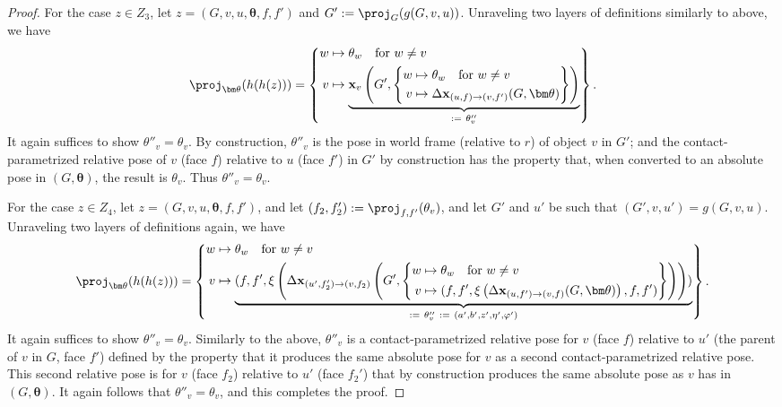 \begin{proof}
For the case $z \in Z_3$, let $z = (G, v, u, \bm\theta, f, f')$ and $G' := \proj_G(g(G, v, u))$.
Unraveling two layers of definitions similarly to above, we have
\[
    \proj_{\bm\theta}(h(h(z))) = \left\{\begin{aligned}
        w &\mapsto \theta_w \quad\text{for $w \neq v$} \\
        v &\mapsto \underbrace{
            \mathbf{x}_v\left(
                G',
                \left\{\begin{aligned}
                        w &\mapsto \theta_w \quad\text{for $w \neq v$} \\
                        v &\mapsto \Delta\mathbf{x}_{(u,f) \to (v,f')}(G, \bm\theta)
                \end{aligned}\right\}
            \right)
        }_{:=\ \theta''_v}
    \end{aligned}\right\}.
\]
It again suffices to show $\theta''_v = \theta_v$.
By construction, $\theta''_v$ is the pose in world frame (relative to $r$) of object $v$ in $G'$; and the contact-parametrized relative pose of $v$ (face $f$) relative to $u$ (face $f'$) in $G'$ by construction has the property that, when converted to an absolute pose in $(G, \bm\theta)$, the result is $\theta_v$.
Thus $\theta''_v = \theta_v$.

For the case $z \in Z_4$, let $z = (G, v, u, \bm\theta, f, f')$, and let $(f_2, f_2') := \proj_{f,f'}(\theta_v)$, and let $G'$ and $u'$ be such that $(G', v, u') = g(G, v, u)$.
Unraveling two layers of definitions again, we have
\[
    \proj_{\bm\theta}(h(h(z))) = \left\{\begin{aligned}
        w &\mapsto \theta_w \quad\text{for $w \neq v$} \\
        v &\mapsto \underbrace{(f, f', \xi\left(
                \Delta\mathbf{x}_{(u', f_2') \to (v, f_2)}\left(
                    G',
                    \left\{\begin{aligned}
                        w &\mapsto \theta_w \quad\text{for $w \neq v$} \\
                        v &\mapsto (f, f', \xi\left(
                            \Delta\mathbf{x}_{(u, f') \to (v, f)}(G, \bm\theta)
                        \right),
                        f, f')
                    \end{aligned}\right\}
                \right)
            \right)
        )}_{:=\ \theta''_v\ :=\ (a', b', z', \eta', \varphi')}
    \end{aligned}\right\}.
\]
It again suffices to show $\theta''_v = \theta_v$.  Similarly to the above, $\theta''_v$ is a contact-parametrized relative pose for $v$ (face $f$) relative to $u'$ (the parent of $v$ in $G$, face $f'$) defined by the property that it produces the same absolute pose for $v$ as a second contact-parametrized relative pose.
This second relative pose is for $v$ (face $f_2$) relative to $u'$ (face $f_2'$) that by construction produces the same absolute pose as $v$ has in $(G, \bm\theta)$.
It again follows that $\theta''_v = \theta_v$, and this completes the proof.
\end{proof}

